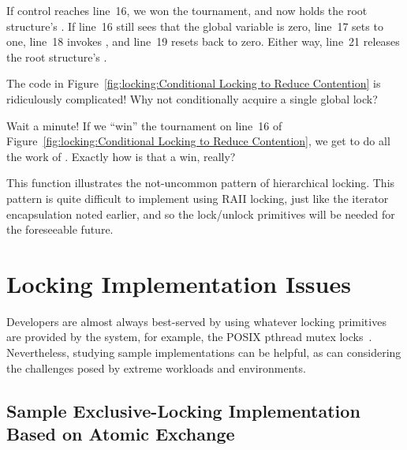 If control reaches line~16, we won the tournament, and now holds the
root  structure's .
If line~16 still sees that the global variable  is zero,
line~17 sets  to one, line~18 invokes
, and line~19 resets 
back to zero.
Either way, line~21 releases the root  structure's
.

\QuickQuiz{}
	The code in
	Figure~\ref{fig:locking:Conditional Locking to Reduce Contention}
	is ridiculously complicated!
	Why not conditionally acquire a single global lock?
 \QuickQuizEnd

\QuickQuiz{}
	Wait a minute!
	If we ``win'' the tournament on line~16 of
	Figure~\ref{fig:locking:Conditional Locking to Reduce Contention},
	we get to do all the work of .
	Exactly how is that a win, really?
 \QuickQuizEnd

This function illustrates the not-uncommon pattern of hierarchical
locking.
This pattern is quite difficult to implement using RAII locking,
just like the iterator encapsulation noted earlier,
and so the lock/unlock primitives will be needed for the foreseeable
future.

\section{Locking Implementation Issues}
\label{sec:locking:Locking Implementation Issues}

Developers are almost always best-served by using whatever locking
primitives are provided by the system, for example, the POSIX
pthread mutex locks~\cite{OpenGroup1997pthreads,Butenhof1997pthreads}.
Nevertheless, studying sample implementations can be helpful,
as can considering the challenges posed by extreme workloads and
environments.

\subsection{Sample Exclusive-Locking Implementation Based on Atomic Exchange}
\label{sec:locking:Sample Exclusive-Locking Implementation Based on Atomic Exchange}

